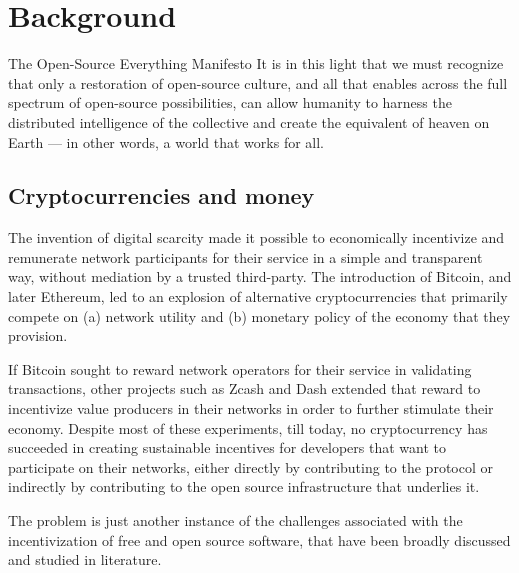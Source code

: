 \section{Background}

\begin{epigraph}{The Open-Source Everything Manifesto}
    \noindent It is in this light that we must recognize that only a restoration of
    open-source culture, and all that enables across the full spectrum of
    open-source possibilities, can allow humanity to harness the distributed
    intelligence of the collective and create the equivalent of heaven on Earth
    --- in other words, a world that works for all.
\end{epigraph}

\subsection{Cryptocurrencies and money}

The invention of digital scarcity made it possible to economically incentivize
and remunerate network participants for their service in a simple and transparent
way, without mediation by a trusted third-party. The introduction of Bitcoin,
and later Ethereum, led to an explosion of alternative cryptocurrencies that
primarily compete on (a) network utility and (b) monetary policy of the economy
that they provision.


If Bitcoin sought to reward network operators for their service in validating
transactions, other projects such as Zcash and Dash extended that reward to
incentivize value producers in their networks in order to further stimulate
their economy. Despite most of these experiments, till today, no cryptocurrency
has succeeded in creating sustainable incentives for developers that want to
participate on their networks, either directly by contributing to the protocol
or indirectly by contributing to the open source infrastructure that underlies
it.

The problem is just another instance of the challenges associated with the
incentivization of free and open source software, that have been broadly
discussed and studied in literature.

